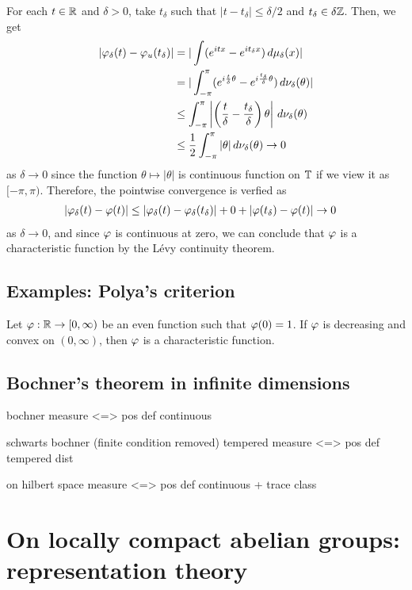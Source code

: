 \documentclass[12pt]{article}
\begin{document}
\begin{pf}
For each $t\in\mathbb{R}$ and $\delta>0$, take $t_\delta$ such that $|t-t_\delta|\le\delta/2$ and $t_\delta\in\delta\mathbb{Z}$.
Then, we get
\begin{align*}
|\varphi_\delta(t)-\varphi_u(t_\delta)|
&=|\int(e^{itx}-e^{it_\delta x})\,d\mu_\delta(x)|\\
&=|\int_{-\pi}^\pi(e^{i\frac t\delta\theta}-e^{i\frac{t_\delta}\delta\theta})\,d\nu_\delta(\theta)|\\
&\le\int_{-\pi}^\pi\left|\left(\frac t\delta-\frac{t_\delta}\delta\right)\theta\right|\,d\nu_\delta(\theta)\\
&\le\frac12\int_{-\pi}^\pi|\theta|\,d\nu_\delta(\theta)\to0
\end{align*}
as $\delta\to0$ since the function $\theta\mapsto|\theta|$ is continuous function on $\mathbb{T}$ if we view it as $[-\pi,\pi)$.
Therefore, the pointwise convergence is verfied as
\begin{align*}
|\varphi_\delta(t)-\varphi(t)|&\le|\varphi_\delta(t)-\varphi_\delta(t_\delta)|+0+|\varphi(t_\delta)-\varphi(t)|\to0
\end{align*}
as $\delta\to0$, and since $\varphi$ is continuous at zero, we can conclude that $\varphi$ is a characteristic function by the L\'evy continuity theorem.
\end{pf}




\subsection{Examples: Polya's criterion}
\begin{thm}
Let $\varphi:\mathbb{R}\to[0,\infty)$ be an even function such that $\varphi(0)=1$.
If $\varphi$ is decreasing and convex on $(0,\infty)$, then $\varphi$ is a characteristic function.
\end{thm}

\subsection{Bochner's theorem in infinite dimensions}

bochner
measure <=> pos def continuous

schwarts bochner (finite condition removed)
tempered measure <=> pos def tempered dist


on hilbert space
measure <=> pos def continuous + trace class







\newpage
\section{On locally compact abelian groups: representation theory}
\end{document}
